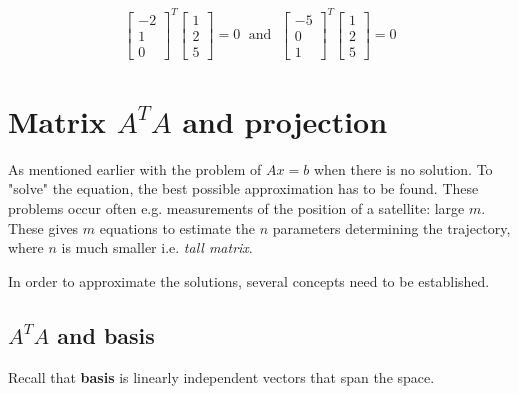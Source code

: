 \documentclass[10pt,a4paper]{article}
\begin{document}
\begin{itemize}
\begin{itemize}
        \begin{align*}
            \begin{bmatrix} 
                -2\\1\\0
            \end{bmatrix}^T\begin{bmatrix}
                1\\2\\5
            \end{bmatrix} = 0 \; \text{ and } \; \begin{bmatrix}
                -5\\0\\1
            \end{bmatrix}^T\begin{bmatrix}
                1\\2\\5
            \end{bmatrix} =0
        \end{align*}
    \end{itemize}
\end{itemize}

\pagebreak

\section{Matrix $A^T A$ and projection}

As mentioned earlier with the problem of $Ax = b$ when there is no solution. To "solve" the
equation, the best possible approximation has to be found. These problems occur often e.g.
measurements of the position of a satellite: large $m$. These gives $m$ equations to estimate the $n$
parameters determining the trajectory, where $n$ is much smaller i.e. \textit{tall matrix}. 

In order to approximate the solutions, several concepts need to be established.

\subsection{$A^T A$ and basis}

Recall that \textbf{basis} is linearly independent vectors that span the space. 
\end{document}
